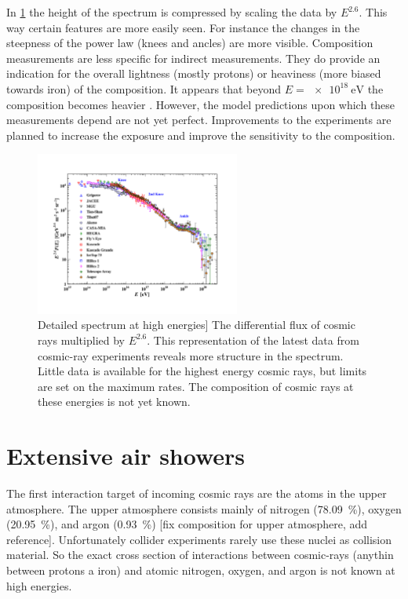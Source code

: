 In \cref{fig:PDG_28_8_all_particle_spectrum} the height of the spectrum is compressed by scaling the data by $E^{2.6}$. This way certain features are more easily seen. For instance the changes in the steepness of the power law (knees and ancles) are more visible. Composition measurements are less specific for indirect measurements. They do provide an indication for the overall lightness (mostly protons) or heaviness (more biased towards iron) of the composition. It appears that beyond $E = \SI{e18}{\eV}$ the composition becomes heavier \cite{abbasi2015combined}. However, the model predictions upon which these measurements depend are not yet perfect. Improvements to the experiments are planned to increase the exposure and improve the sensitivity to the composition.

\begin{figure}
    \centering
    \includegraphics[width=0.6\textwidth]
                    {plots/cosmic-rays/PDG_28_8_all_particle_spectrum}
    \caption{Detailed spectrum at high energies]
The differential flux of cosmic rays multiplied by $E^{2.6}$. This representation of the latest data from cosmic-ray experiments reveals more structure in the spectrum. Little data is available for the highest energy cosmic rays, but limits are set on the maximum rates. The composition of cosmic rays at these energies is not yet known.}
    \label{fig:PDG_28_8_all_particle_spectrum}
\end{figure}


\section{Extensive air showers}
\label{sec:cr:eas}

The first interaction target of incoming cosmic rays are the atoms in the upper atmosphere. The upper atmosphere consists mainly of nitrogen (\SI{78.09}{\percent}), oxygen (\SI{20.95}{\percent}), and argon (\SI{0.93}{\percent}) [fix composition for upper atmosphere, add reference]. Unfortunately collider experiments rarely use these nuclei as collision material. So the exact cross section of interactions between cosmic-rays (anythin between protons a iron) and atomic nitrogen, oxygen, and argon is not known at high energies.

